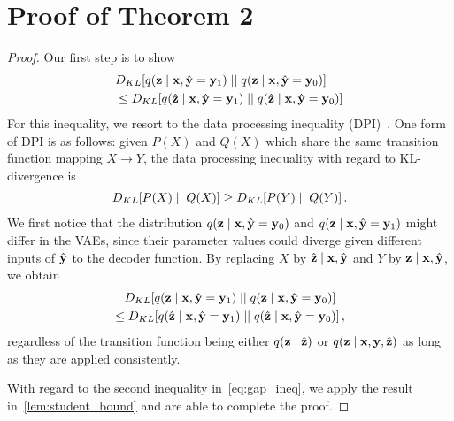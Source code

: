 {\section{Proof of Theorem 2}
\begin{proof} 
Our first step is to show 
\begin{align}
&D_{KL}[ q(\mathbf{z} \mid \mathbf{x}, \hat{\mathbf{y}} = \mathbf{y}_1) \mid\mid q(\mathbf{z} \mid \mathbf{x}, \hat{\mathbf{y}} = \mathbf{y}_0)] \notag \\
&\le D_{KL}[ q(\hat{\mathbf{z}} \mid \mathbf{x}, \hat{\mathbf{y}} = \mathbf{y}_1) \mid\mid q(\hat{\mathbf{z}} \mid \mathbf{x}, \hat{\mathbf{y}} = \mathbf{y}_0)] \,
\end{align}
For this inequality, we resort to the data processing inequality (DPI)~\cite{thomas2006elements}.
One form of DPI is as follows: given $P(X)$ and $Q(X)$ which share the same transition function mapping $X \to Y$, the data processing inequality with regard to KL-divergence is 
\begin{align}
  D_{KL}[P(X) \mid \mid Q(X)] \geq D_{KL}[P(Y) \mid \mid Q(Y)] \,. 
\end{align}  
We first notice that the distribution $q(\mathbf{z} \mid \mathbf{x},  \hat{\mathbf{y}}=\mathbf{y}_0)$ and $ q(\mathbf{z} \mid \mathbf{x}, \hat{\mathbf{y}}=\mathbf{y}_1)$ might differ in the VAEs, since their parameter values could diverge given different inputs of $\hat{\mathbf{y}}$ to the decoder function.
By replacing $X$ by $\hat{\mathbf{z}} \mid \mathbf{x}, \hat{\mathbf{y}}$ and $Y$ by $\mathbf{z} \mid \mathbf{x}, \hat{\mathbf{y}}$, we obtain 
\begin{multline}
D_{KL}[ q(\mathbf{z} \mid \mathbf{x}, \hat{\mathbf{y}}=\mathbf{y}_1) \mid\mid q(\mathbf{z} \mid \mathbf{x}, \hat{\mathbf{y}}=\mathbf{y}_0)] \\
\le D_{KL}[ q(\hat{\mathbf{z}} \mid \mathbf{x}, \hat{\mathbf{y}}=\mathbf{y}_1) \mid\mid q(\hat{\mathbf{z}} \mid \mathbf{x}, \hat{\mathbf{y}}=\mathbf{y}_0)] \,,
\end{multline}  
regardless of the transition function being either $q(\mathbf{z} \mid \hat{\mathbf{z}})$ or $q(\mathbf{z} \mid \mathbf{x}, \mathbf{y}, \hat{\mathbf{z}})$ as long as they are applied consistently.
   
With regard to the second inequality in~\cref{eq:gap_ineq}, we apply the result in~\cref{lem:student_bound} and are able to complete the proof.
\end{proof}

}
